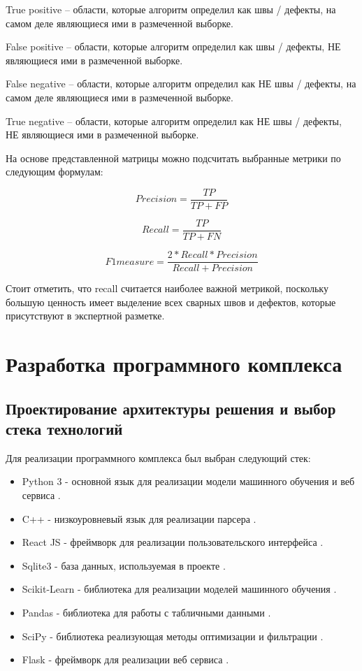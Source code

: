 \documentclass[a4paper,article,14pt]{extarticle}
\begin{document}
True positive – области, которые алгоритм определил как швы / дефекты, на самом деле являющиеся ими в размеченной выборке.

False positive – области, которые алгоритм определил как швы / дефекты, НЕ являющиеся ими в размеченной выборке.

False negative – области, которые алгоритм определил как НЕ швы / дефекты, на самом деле являющиеся ими в размеченной выборке.

True negative – области, которые алгоритм определил как НЕ швы / дефекты, НЕ являющиеся ими в размеченной выборке.

На основе представленной матрицы можно подсчитать выбранные метрики по следующим формулам:

\begin{equation}
    Precision = \frac{TP}{TP+FP}
\end{equation}

\begin{equation}
    Recall = \frac{TP}{TP+FN}
\end{equation}

\begin{equation}
    F1measure = \frac{2*Recall*Precision}{Recall+Precision}
\end{equation}

Стоит отметить, что recall считается наиболее важной метрикой, поскольку большую ценность имеет выделение всех сварных швов и дефектов, которые присутствуют в экспертной разметке. 

\pagebreak
\section{Разработка программного комплекса}

\subsection{Проектирование архитектуры решения и выбор стека технологий}

Для реализации программного комплекса был выбран следующий стек:
\begin{itemize}
    \item Python 3 - основной язык для реализации модели машинного обучения и веб сервиса \cite{s5}.
    \item C++ - низкоуровневый язык для реализации парсера \cite{s6}.
    \item React JS - фреймворк для реализации пользовательского интерфейса \cite{s7}.
    \item Sqlite3 - база данных, используемая в проекте \cite{s8}.
    \item Scikit-Learn - библиотека для реализации моделей машинного обучения \cite{s9}.
    \item Pandas - библиотека для работы с табличными данными \cite{s10}.
    \item SciPy - библиотека реализующая методы оптимизации и фильтрации \cite{s11}.
    \item Flask - фреймворк для реализации веб сервиса \cite{s12}. 
\end{itemize}
\end{document}
